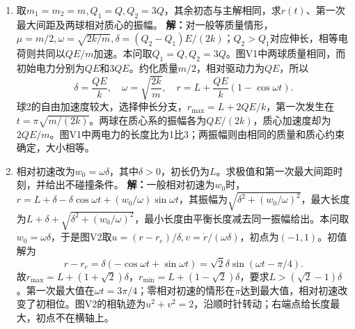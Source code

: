 \documentclass[UTF8,fontset=fandol,a4paper,11pt]{ctexart}
\newcommand{\figcaption}[1]{\par\vspace{2pt}{\small\color{muted}#1}\par}
\begin{document}
\begin{enumerate}
\item 取$m_1=m_2=m,Q_1=Q,Q_2=3Q$，其余初态与主解相同，求$r(t)$、第一次最大间距及两球相对质心的振幅。
\textbf{解：}对一般等质量情形，$\mu=m/2,\omega=\sqrt{2k/m},\delta=(Q_2-Q_1)E/(2k)$；$Q_2>Q_1$对应伸长，相等电荷则共同以$QE/m$加速。本问取$Q_1=Q,Q_2=3Q$。图V1中两球质量相同，而初始电力分别为$QE$和$3QE$。约化质量$m/2$，相对驱动力为$QE$，所以
\[\delta=\frac{QE}{k},\quad\omega=\sqrt{\frac{2k}{m}},\quad r=L+\frac{QE}{k}(1-\cos\omega t).\]
球2的自由加速度较大，选择伸长分支，$r_{\max}=L+2QE/k$，第一次发生在$t=\pi\sqrt{m/(2k)}$。两球在质心系的振幅各为$QE/(2k)$，质心加速度却为$2QE/m$。图V1中两电力的长度比为1比3；两振幅则由相同的质量和质心约束确定，大小相等。
\begin{center}\begin{minipage}{.98\linewidth}\centering
{}
\figcaption{变图电试1.1V1}
\end{minipage}\end{center}

\item 相对初速改为$w_0=\omega\delta$，其中$\delta>0$，初长仍为$L$。求极值和第一次最大间距时刻，并给出不碰撞条件。
\textbf{解：}一般相对初速为$w_0$时，$r=L+\delta-\delta\cos\omega t+(w_0/\omega)\sin\omega t$，其振幅为$\sqrt{\delta^2+(w_0/\omega)^2}$，最大长度为$L+\delta+\sqrt{\delta^2+(w_0/\omega)^2}$，最小长度由平衡长度减去同一振幅给出。本问取$w_0=\omega\delta$，于是图V2取$u=(r-r_e)/\delta,v=\dot r/(\omega\delta)$，初点为$(-1,1)$。初值解为
\[r-r_e=\delta(-\cos\omega t+\sin\omega t)=\sqrt2\delta\sin(\omega t-\pi/4).\]
故$r_{\max}=L+(1+\sqrt2)\delta$，$r_{\min}=L+(1-\sqrt2)\delta$，要求$L>(\sqrt2-1)\delta$。第一次最大值在$\omega t=3\pi/4$；零相对初速的情形在$\pi$达到最大值，相对初速改变了初相位。图V2的相轨迹为$u^2+v^2=2$，沿顺时针转动；右端点给长度最大，初点不在横轴上。
\begin{center}\begin{minipage}{.98\linewidth}\centering
{}
\figcaption{变图电试1.1V2}
\end{minipage}\end{center}


\end{enumerate}
\end{document}
